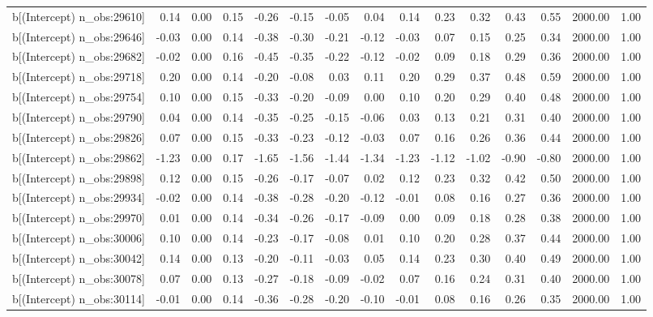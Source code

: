 \begin{table}[ht]
\begin{tabular}{rrrrrrrrrrrrrrr}
  b[(Intercept) n\_obs:29610] & 0.14 & 0.00 & 0.15 & -0.26 & -0.15 & -0.05 & 0.04 & 0.14 & 0.23 & 0.32 & 0.43 & 0.55 & 2000.00 & 1.00 \\ 
  b[(Intercept) n\_obs:29646] & -0.03 & 0.00 & 0.14 & -0.38 & -0.30 & -0.21 & -0.12 & -0.03 & 0.07 & 0.15 & 0.25 & 0.34 & 2000.00 & 1.00 \\ 
  b[(Intercept) n\_obs:29682] & -0.02 & 0.00 & 0.16 & -0.45 & -0.35 & -0.22 & -0.12 & -0.02 & 0.09 & 0.18 & 0.29 & 0.36 & 2000.00 & 1.00 \\ 
  b[(Intercept) n\_obs:29718] & 0.20 & 0.00 & 0.14 & -0.20 & -0.08 & 0.03 & 0.11 & 0.20 & 0.29 & 0.37 & 0.48 & 0.59 & 2000.00 & 1.00 \\ 
  b[(Intercept) n\_obs:29754] & 0.10 & 0.00 & 0.15 & -0.33 & -0.20 & -0.09 & 0.00 & 0.10 & 0.20 & 0.29 & 0.40 & 0.48 & 2000.00 & 1.00 \\ 
  b[(Intercept) n\_obs:29790] & 0.04 & 0.00 & 0.14 & -0.35 & -0.25 & -0.15 & -0.06 & 0.03 & 0.13 & 0.21 & 0.31 & 0.40 & 2000.00 & 1.00 \\ 
  b[(Intercept) n\_obs:29826] & 0.07 & 0.00 & 0.15 & -0.33 & -0.23 & -0.12 & -0.03 & 0.07 & 0.16 & 0.26 & 0.36 & 0.44 & 2000.00 & 1.00 \\ 
  b[(Intercept) n\_obs:29862] & -1.23 & 0.00 & 0.17 & -1.65 & -1.56 & -1.44 & -1.34 & -1.23 & -1.12 & -1.02 & -0.90 & -0.80 & 2000.00 & 1.00 \\ 
  b[(Intercept) n\_obs:29898] & 0.12 & 0.00 & 0.15 & -0.26 & -0.17 & -0.07 & 0.02 & 0.12 & 0.23 & 0.32 & 0.42 & 0.50 & 2000.00 & 1.00 \\ 
  b[(Intercept) n\_obs:29934] & -0.02 & 0.00 & 0.14 & -0.38 & -0.28 & -0.20 & -0.12 & -0.01 & 0.08 & 0.16 & 0.27 & 0.36 & 2000.00 & 1.00 \\ 
  b[(Intercept) n\_obs:29970] & 0.01 & 0.00 & 0.14 & -0.34 & -0.26 & -0.17 & -0.09 & 0.00 & 0.09 & 0.18 & 0.28 & 0.38 & 2000.00 & 1.00 \\ 
  b[(Intercept) n\_obs:30006] & 0.10 & 0.00 & 0.14 & -0.23 & -0.17 & -0.08 & 0.01 & 0.10 & 0.20 & 0.28 & 0.37 & 0.44 & 2000.00 & 1.00 \\ 
  b[(Intercept) n\_obs:30042] & 0.14 & 0.00 & 0.13 & -0.20 & -0.11 & -0.03 & 0.05 & 0.14 & 0.23 & 0.30 & 0.40 & 0.49 & 2000.00 & 1.00 \\ 
  b[(Intercept) n\_obs:30078] & 0.07 & 0.00 & 0.13 & -0.27 & -0.18 & -0.09 & -0.02 & 0.07 & 0.16 & 0.24 & 0.31 & 0.40 & 2000.00 & 1.00 \\ 
  b[(Intercept) n\_obs:30114] & -0.01 & 0.00 & 0.14 & -0.36 & -0.28 & -0.20 & -0.10 & -0.01 & 0.08 & 0.16 & 0.26 & 0.35 & 2000.00 & 1.00 \\ 

\end{tabular}
\end{table}
